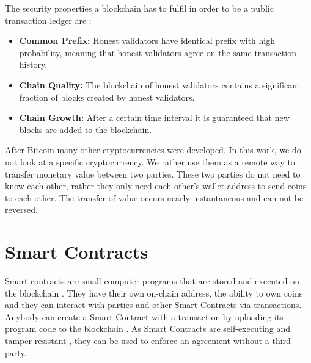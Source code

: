 \documentclass{cacthesis}
\begin{document}
The security properties a blockchain has to fulfil in order to be a public transaction ledger are \cite{bitcoin_backbone}:
\begin{itemize}
    \item \textbf{Common Prefix:} Honest validators have identical prefix with high probability, meaning that honest validators agree on the same transaction history.
    \item \textbf{Chain Quality:} The blockchain of honest validators contains a significant fraction of blocks created by honest validators.
    \item \textbf{Chain Growth:} After a certain time interval it is guaranteed that new blocks are added to the blockchain.
\end{itemize}

After Bitcoin many other cryptocurrencies were developed. In this work, we do not look at a specific cryptocurrency. We rather use them as a remote way to transfer monetary value between two parties. These two parties do not need to know each other, rather they only need each other's wallet address to send coins to each other. The transfer of value occurs nearly instantaneous and can not be reversed.

\section{Smart Contracts}
Smart contracts are small computer programs that are stored and executed on the blockchain \cite{chrisistidis}. They have their own on-chain address, the ability to own coins and they can interact with parties and other Smart Contracts via transactions. Anybody can create a Smart Contract with a transaction by uploading its program code to the blockchain \cite{narayanan2016bitcoin}. As Smart Contracts are self-executing and tamper resistant \cite{sc18}, they can be used to enforce an agreement without a third party.\newline
\end{document}
